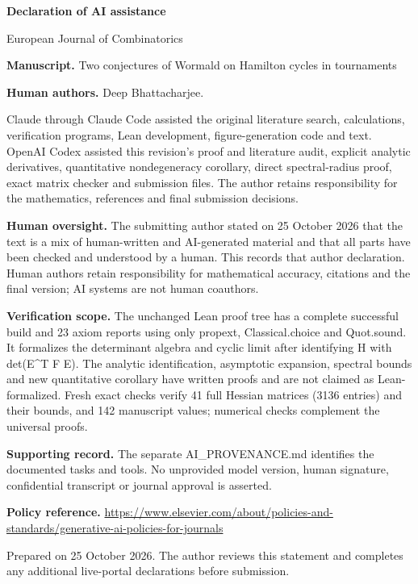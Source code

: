 \documentclass[11pt]{article}
\begin{document}
{\Large\bfseries\color{ink} Declaration of AI assistance}\par
European Journal of Combinatorics\par{}\par\medskip
\textbf{Manuscript.} Two conjectures of Wormald on Hamilton cycles in tournaments\par

\textbf{Human authors.} Deep Bhattacharjee.\par

Claude through Claude Code assisted the original literature search, calculations, verification programs, Lean development, figure-generation code and text. OpenAI Codex assisted this revision's proof and literature audit, explicit analytic derivatives, quantitative nondegeneracy corollary, direct spectral-radius proof, exact matrix checker and submission files. The author retains responsibility for the mathematics, references and final submission decisions.\par

\textbf{Human oversight.} The submitting author stated on 25 October 2026 that the text is a mix of human-written and AI-generated material and that all parts have been checked and understood by a human. This records that author declaration. Human authors retain responsibility for mathematical accuracy, citations and the final version; AI systems are not human coauthors.\par

\textbf{Verification scope.} The unchanged Lean proof tree has a complete successful build and 23 axiom reports using only propext, Classical.choice and Quot.sound. It formalizes the determinant algebra and cyclic limit after identifying H with det(E\textasciicircum{}T F E). The analytic identification, asymptotic expansion, spectral bounds and new quantitative corollary have written proofs and are not claimed as Lean-formalized. Fresh exact checks verify 41 full Hessian matrices (3136 entries) and their bounds, and 142 manuscript values; numerical checks complement the universal proofs.\par

\textbf{Supporting record.} The separate AI\_PROVENANCE.md identifies the documented tasks and tools. No unprovided model version, human signature, confidential transcript or journal approval is asserted.\par

\textbf{Policy reference.} \url{https://www.elsevier.com/about/policies-and-standards/generative-ai-policies-for-journals}\par

{\small Prepared on 25 October 2026. The author reviews this statement and completes any additional live-portal declarations before submission.}
\end{document}
